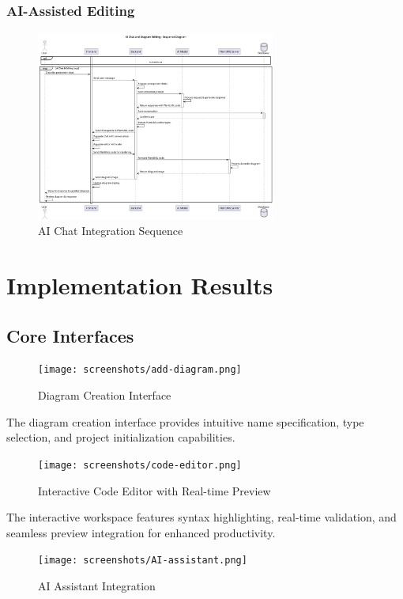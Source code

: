 \subsubsection{AI-Assisted Editing}
\begin{figure}[H]
\centering
\includegraphics[width=0.7\textwidth]{conception/SprintIV/sequence_diagrams/sequence_workspaceManagement_5_3_ChatWithAIMode.png}
\caption{AI Chat Integration Sequence}
\end{figure}

\section{Implementation Results}

\subsection{Core Interfaces}

\begin{figure}[H]
\centering
\texttt{[image: screenshots/add-diagram.png]}
\caption{Diagram Creation Interface}
\end{figure}

The diagram creation interface provides intuitive name specification, type selection, and project initialization capabilities.

\begin{figure}[H]
\centering
\texttt{[image: screenshots/code-editor.png]}
\caption{Interactive Code Editor with Real-time Preview}
\end{figure}

The interactive workspace features syntax highlighting, real-time validation, and seamless preview integration for enhanced productivity.

\begin{figure}[H]
\centering
\texttt{[image: screenshots/AI-assistant.png]}
\caption{AI Assistant Integration}
\end{figure}

